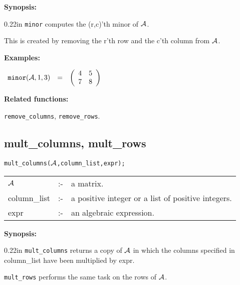 {\bf Synopsis:} %

\begin{addtolength}{\leftskip}{0.22in}
                {\tt minor} computes the (r,c)'th minor of ${\cal A}$.
 
                This is created by removing the r'th row and the c'th 
                column from ${\cal A}$.

\end{addtolength}
                
{\bf Examples:}

\begin{flushleft}  
\hspace*{0.1in}
\begin{math}  
\begin{array}{ccc}
{\tt minor}({\cal A},1,3) & = & 
        \left( \begin{array}{cc} 4 & 5 \\ 7 & 8
 \end{array} \right) 
\end{array}
\end{math}  
\end{flushleft}

{\bf Related functions:}

\hspace*{0.175in} {\tt remove\_columns}, {\tt remove\_rows}.


\subsection{mult\_columns, mult\_rows}


\hspace*{0.175in} {\tt mult\_columns(${\cal A}$,column\_list,expr);}

\hspace*{0.1in}  
\begin{tabular}{l l l}
${\cal A}$   &:-& a matrix. \\
column\_list &:-& a positive integer or a list of positive integers. \\
expr        &:-& an algebraic expression.
\end{tabular}

{\bf Synopsis:} %

\begin{addtolength}{\leftskip}{0.22in}
{\tt mult\_columns} returns a copy of ${\cal A}$ in which
                the columns specified in column\_list have been 
multiplied by expr. 

{\tt mult\_rows} performs the same task on the rows of ${\cal A}$.

\end{addtolength}


